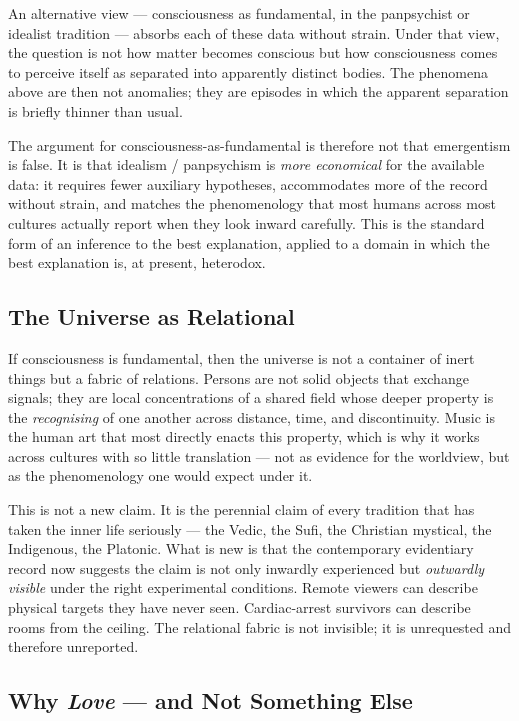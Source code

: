 \documentclass[11pt,a4paper]{article}
\begin{document}
An alternative view --- consciousness as fundamental, in the
panpsychist or idealist tradition --- absorbs each of these data
without strain. Under that view, the question is not how matter
becomes conscious but how consciousness comes to perceive itself
as separated into apparently distinct bodies. The phenomena above
are then not anomalies; they are episodes in which the apparent
separation is briefly thinner than usual.

The argument for consciousness-as-fundamental is therefore not
that emergentism is false. It is that idealism / panpsychism is
\emph{more economical} for the available data: it requires fewer
auxiliary hypotheses, accommodates more of the record without
strain, and matches the phenomenology that most humans across
most cultures actually report when they look inward carefully.
This is the standard form of an inference to the best explanation,
applied to a domain in which the best explanation is, at present,
heterodox.

\subsection{The Universe as Relational}

If consciousness is fundamental, then the universe is not a
container of inert things but a fabric of relations. Persons are
not solid objects that exchange signals; they are local
concentrations of a shared field whose deeper property is the
\emph{recognising} of one another across distance, time, and
discontinuity. Music is the human art that most directly enacts
this property, which is why it works across cultures with so
little translation --- not as evidence for the worldview, but as
the phenomenology one would expect under it.

This is not a new claim. It is the perennial claim of every
tradition that has taken the inner life seriously --- the Vedic,
the Sufi, the Christian mystical, the Indigenous, the Platonic.
What is new is that the contemporary evidentiary record now
suggests the claim is not only inwardly experienced but
\emph{outwardly visible} under the right experimental conditions.
Remote viewers can describe physical targets they have never seen.
Cardiac-arrest survivors can describe rooms from the ceiling. The
relational fabric is not invisible; it is unrequested and
therefore unreported.

\subsection{Why \emph{Love} --- and Not Something Else}
\end{document}
